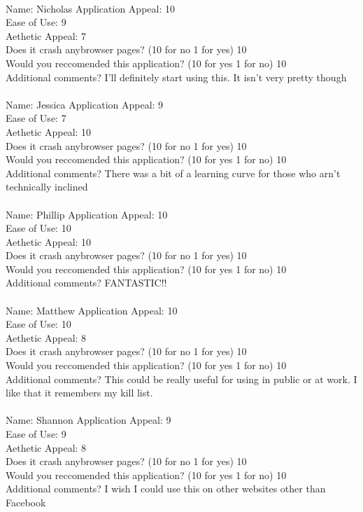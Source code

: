 \documentclass[12pt, titlepage]{article}
\begin{document}
\\
Name: Nicholas
Application Appeal: 10 \\ 
Ease of Use: 9\\ 
Aethetic Appeal: 7\\ 
Does it crash anybrowser pages? (10 for no 1 for yes) 10\\ 
Would you reccomended this application? (10 for yes 1 for no) 10\\ 
Additional comments? I'll definitely start using this. It isn't very pretty though\\

\\
Name: Jessica
Application Appeal: 9 \\ 
Ease of Use: 7\\ 
Aethetic Appeal: 10\\ 
Does it crash anybrowser pages? (10 for no 1 for yes) 10\\ 
Would you reccomended this application? (10 for yes 1 for no) 10\\ 
Additional comments? There was a bit of a learning curve for those who arn't technically inclined\\

\\
Name: Phillip
Application Appeal: 10 \\ 
Ease of Use: 10\\ 
Aethetic Appeal: 10\\ 
Does it crash anybrowser pages? (10 for no 1 for yes) 10\\ 
Would you reccomended this application? (10 for yes 1 for no) 10\\ 
Additional comments? FANTASTIC!!\\

\\
Name: Matthew
Application Appeal: 10 \\ 
Ease of Use: 10\\ 
Aethetic Appeal: 8\\ 
Does it crash anybrowser pages? (10 for no 1 for yes) 10\\ 
Would you reccomended this application? (10 for yes 1 for no) 10\\ 
Additional comments? This could be really useful for using in public or at work. I like that it remembers my kill list.\\

\\
Name: Shannon
Application Appeal: 9 \\ 
Ease of Use: 9\\ 
Aethetic Appeal: 8\\ 
Does it crash anybrowser pages? (10 for no 1 for yes) 10\\ 
Would you reccomended this application? (10 for yes 1 for no) 10\\ 
Additional comments? I wish I could use this on other websites other than Facebook\\
\end{document}
